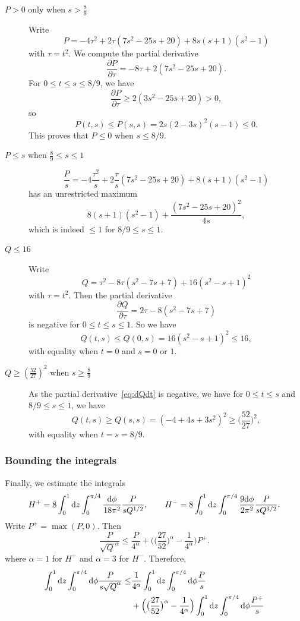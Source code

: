 \documentclass[a4paper]{amsart}
\newcommand{\dd}{{\rm d}}
\theoremstyle{plain} %
\theoremstyle{definition} %
\theoremstyle{remark}
\begin{document}
\begin{description}
	\item[$P > 0$ only when $s > \tfrac{8}{9}$]
		Write
		\[
			P = -4\tau^2 + 2 \tau (7 s^2 - 25 s + 20) + 8 s (s + 1) (s^2 - 1)
		\]
		with $\tau = t^2$.  We compute the partial derivative
		\[
			\frac{\partial P}{\partial \tau} = -8\tau + 2 (7 s^2 - 25 s + 20).
		\]
		For $0 \le t \le s \le 8/9$, we have
		\[
			\frac{\partial P}{\partial \tau} \ge 2 (3s^2 - 25 s + 20) > 0,
		\]
		so
		\[
			P(t,s) \le P(s,s) = 2 s (2-3s)^2 (s-1) \le 0.
		\]
		This proves that $P \le 0$ when $s \le 8/9$.

	\item[$P \le s$ when $\tfrac{8}{9} \le s \le 1$]
		\[
			\frac{P}{s} = -4\frac{\tau^2}{s} + 2 \frac{\tau}{s} (7 s^2 - 25 s + 20) + 8 (s + 1) (s^2 - 1)
		\]
		has an unrestricted maximum
		\[
			8 (s+1) (s^2-1) + \frac{(7 s^2 - 25 s + 20)^2}{4s},
		\]
		which is indeed $\le 1$ for $8/9 \le s \le 1$.

	\item[$Q \le 16$]  Write
		\[
			Q = \tau^2 - 8\tau (s^2-7s+7) + 16(s^2-s+1)^2
		\]
		with $\tau = t^2$.  Then the partial derivative
		\begin{equation}\label{eq:dQdt}
			\frac{\partial Q}{\partial \tau} = 2\tau - 8(s^2-7s+7)
		\end{equation}
		is negative for $0 \le t \le s \le 1$.  So we have
		\[
			Q(t,s) \le Q(0,s) = 16 (s^2-s+1)^2 \le 16,
		\]
		with equality when $t = 0$ and $s=0$ or $1$.

	\item[$Q \ge (\tfrac{52}{27})^2$ when $s \ge \tfrac{8}{9}$] As the partial
		derivative~\eqref{eq:dQdt} is negative, we have for $0 \le t \le s$ and
		$8/9 \le s \le 1$, we have
		\[
			Q(t,s) \ge Q(s,s) = (-4+4s+3s^2)^2 \ge \Big(\frac{52}{27}\Big)^2,
		\]
		with equality when $t = s = 8/9$.
\end{description}

\subsubsection{Bounding the integrals}

Finally, we estimate the integrals
\[
	H^+ = 8 \int_0^1 \dd z \int_0^{\pi/4}
	\frac{\dd\phi}{18\pi^2} \frac{P}{s Q^{1/2}},\qquad
	H^- = 8 \int_0^1 \dd z \int_0^{\pi/4}
	\frac{9 \dd\phi}{2\pi^2} \frac{P}{s Q^{3/2}}.
\]
Write $P^+ = \max(P, 0)$.  Then
\[
	\frac{P}{\sqrt{Q}^\alpha} \le \frac{P}{4^\alpha} + \Big(\big(\frac{27}{52}\big)^\alpha - \frac{1}{4^\alpha}\Big) P^+.
\]
where $\alpha = 1$ for $H^+$ and $\alpha = 3$ for $H^-$.
Therefore,
\begin{align}
	\int_0^1 \dd z \int_0^{\pi/4} 
	\dd\phi \frac{P}{s \sqrt{Q}^\alpha} \le &
	\frac{1}{4^\alpha} \int_0^1 \dd z \int_0^{\pi/4} \dd\phi \frac{P}{s}\label{eq:fstint}\\
	& + \Big(\big(\frac{27}{52}\big)^\alpha - \frac{1}{4^\alpha}\Big) \int_0^1 \dd z \int_0^{\pi/4} \dd\phi \frac{P^+}{s}\label{eq:sndint}
\end{align}
\end{document}
